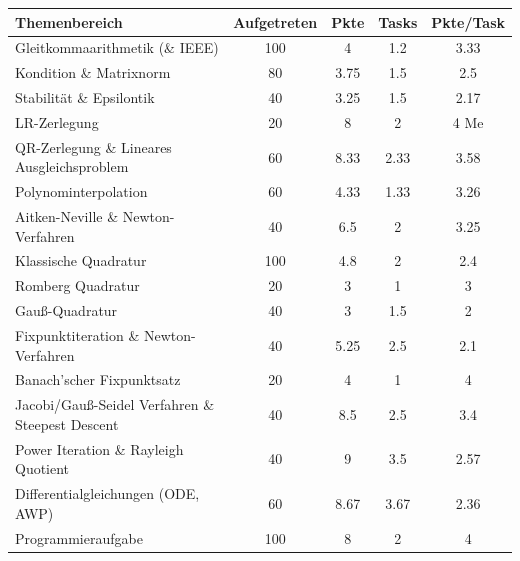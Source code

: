 \documentclass{scrartcl}
\begin{document}
	\begin{table}[H]
		\centering
		\begin{tabular}{lcccc}
			\toprule
			Themenbereich & Aufgetreten & Pkte & Tasks & Pkte/Task \\ \midrule
			Gleitkommaarithmetik (\& IEEE) 		& 100 		& 4 	& 1.2 	& 3.33 \\
			Kondition \& Matrixnorm 	& 80		& 3.75 	& 1.5 	& 2.5 \\
			Stabilität \& Epsilontik	& 40		& 3.25	& 1.5	& 2.17 \\
			LR-Zerlegung				& 20		& 8		& 2		& 4 Me \\
			QR-Zerlegung \& Lineares Ausgleichsproblem & 60 & 8.33 & 2.33 & 3.58 \\
			Polynominterpolation		& 60 		& 4.33 	& 1.33	& 3.26 \\
			Aitken-Neville \& Newton-Verfahren & 40	& 6.5 & 2	& 3.25 \\
			Klassische Quadratur		& 100		& 4.8	& 2		& 2.4 \\
			Romberg Quadratur			& 20		& 3		& 1		& 3 \\
			Gauß-Quadratur				& 40		& 3		& 1.5	& 2 \\
			Fixpunktiteration \& Newton-Verfahren & 40 & 5.25	& 2.5	& 2.1 \\
			Banach'scher Fixpunktsatz	& 20		& 4		& 1		& 4 \\
			Jacobi/Gauß-Seidel Verfahren \& Steepest Descent & 40	& 8.5 & 2.5 & 3.4 \\
			Power Iteration \& Rayleigh Quotient & 40 & 9 	& 3.5 	& 2.57 \\
			Differentialgleichungen (ODE, AWP) & 60 & 8.67 	& 3.67	& 2.36 \\ \midrule
			Programmieraufgabe 			& 100 		& 8		& 2		& 4
		\end{tabular}
	\end{table}
\end{document}
